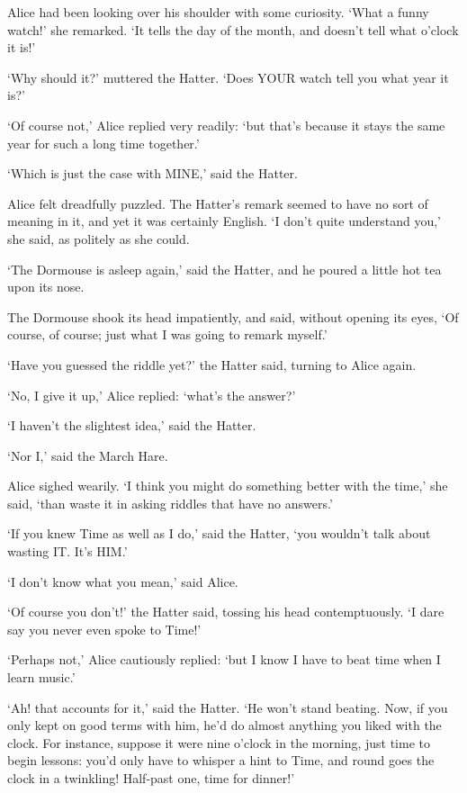 \documentclass[12pt]{book}
\begin{document}
\begin{Parallel}[p]{}{}
{Alice had been looking over his shoulder with some curiosity. ‘What a funny watch!’ she remarked. ‘It tells the day of the month, and doesn’t tell what o’clock it is!’

‘Why should it?’ muttered the Hatter. ‘Does YOUR watch tell you what year it is?’

‘Of course not,’ Alice replied very readily: ‘but that’s because it stays the same year for such a long time together.’

‘Which is just the case with MINE,’ said the Hatter.

Alice felt dreadfully puzzled. The Hatter’s remark seemed to have no sort of meaning in it, and yet it was certainly English. ‘I don’t quite understand you,’ she said, as politely as she could.

‘The Dormouse is asleep again,’ said the Hatter, and he poured a little hot tea upon its nose.

The Dormouse shook its head impatiently, and said, without opening its eyes, ‘Of course, of course; just what I was going to remark myself.’

‘Have you guessed the riddle yet?’ the Hatter said, turning to Alice again.

‘No, I give it up,’ Alice replied: ‘what’s the answer?’

‘I haven’t the slightest idea,’ said the Hatter.

‘Nor I,’ said the March Hare.

Alice sighed wearily. ‘I think you might do something better with the time,’ she said, ‘than waste it in asking riddles that have no answers.’

‘If you knew Time as well as I do,’ said the Hatter, ‘you wouldn’t talk about wasting IT. It’s HIM.’

‘I don’t know what you mean,’ said Alice.

‘Of course you don’t!’ the Hatter said, tossing his head contemptuously. ‘I dare say you never even spoke to Time!’

‘Perhaps not,’ Alice cautiously replied: ‘but I know I have to beat time when I learn music.’

‘Ah! that accounts for it,’ said the Hatter. ‘He won’t stand beating. Now, if you only kept on good terms with him, he’d do almost anything you liked with the clock. For instance, suppose it were nine o’clock in the morning, just time to begin lessons: you’d only have to whisper a hint to Time, and round goes the clock in a twinkling! Half-past one, time for dinner!’

}
\end{Parallel}
\end{document}
